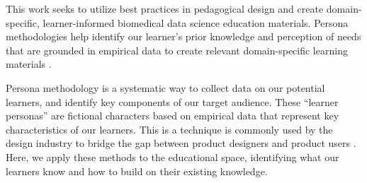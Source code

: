 \documentclass[020-persona\_validation.tex]{subfiles}
\begin{document}


    This work seeks to utilize best practices in pedagogical design and create domain-specific,
    learner-informed biomedical data science education materials.
    Persona methodologies help identify our learner's prior knowledge and perception of needs
    that are grounded in empirical data
    to create relevant domain-specific learning materials
    \cite{pruittPersonaLifecycleKeeping2006, zagallo2019through, schwartzParadoxChoiceWhy2016}.

    Persona methodology is a systematic way to collect data on our potential learners,
    and identify key components of our target audience.
    These ``learner personas'' are fictional characters based on empirical data that represent key characteristics
    of our learners.
    This is a technique is commonly used by the design industry to bridge the gap between product designers and product users
    \cite{pruittPersonaLifecycleKeeping2006, zagallo2019through, schwartzParadoxChoiceWhy2016}.
    Here, we apply these methods to the educational space,
    identifying what our learners know and how to build on their existing knowledge.
\end{document}

